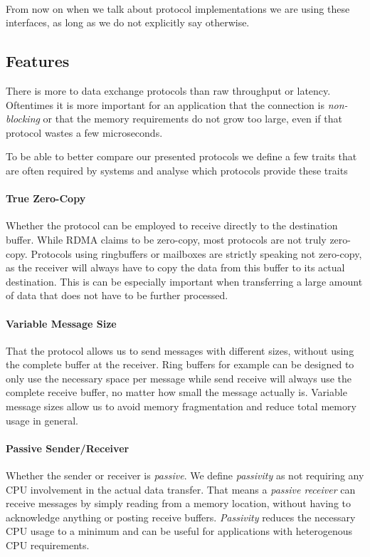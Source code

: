 \paragraph{} From now on when we talk about protocol implementations we are using these interfaces, as long as we do not 
explicitly say otherwise.

\pagebreak

\subsection{Features}

There is more to data exchange protocols than raw throughput or latency. Oftentimes it is more important for an application
that the connection is \emph{non-blocking} or that the memory requirements do not grow too large, even if that protocol wastes
a few microseconds.

To be able to better compare our presented protocols we define a few traits that are often required by systems and
analyse which protocols provide these traits

\paragraph{True Zero-Copy} Whether the protocol can be employed to receive directly to the destination buffer. While RDMA 
claims to be zero-copy, most protocols are not truly zero-copy. Protocols using ringbuffers or mailboxes are
strictly speaking not zero-copy, as the receiver will always have to copy the data from this buffer to its actual destination.
This is can be especially important when transferring a large amount of data that does not have to be further processed.

\paragraph{Variable Message Size} That the protocol allows us to send messages with different sizes, without using the 
complete buffer at the receiver. Ring buffers for example can be designed to only use the necessary space per message
while send receive will always use the complete receive buffer, no matter how small the message actually is. Variable
message sizes allow us to avoid memory fragmentation and reduce total memory usage in general.

\paragraph{Passive Sender/Receiver} Whether the sender or receiver is \emph{passive}. We define \emph{passivity} as not 
requiring any CPU involvement in the actual data transfer. That means a \emph{passive receiver} can receive messages by
simply reading from a memory location, without having to acknowledge anything or posting receive buffers. \emph{Passivity} 
reduces the necessary CPU usage to a minimum and can be useful for applications with heterogenous CPU requirements.

